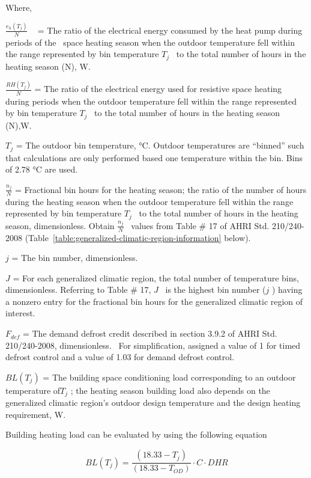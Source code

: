 Where,

\(\frac{{{e_h}({T_j})}}{N}\) ~ = The ratio of the electrical energy consumed by the heat pump during periods of the ~space heating season when the outdoor temperature fell within the range represented by bin temperature \({T_j}\) ~to the total number of hours in the heating season (N), W.

\(\frac{{RH({T_j})}}{N}\) = The ratio of the electrical energy used for resistive space heating during periods when the outdoor temperature fell within the range represented by bin temperature \({T_j}\) ~to the total number of hours in the heating season (N),W.

\({T_j}\) = The outdoor bin temperature, °C. Outdoor temperatures are ``binned'' such that calculations are only performed based one temperature within the bin. Bins of 2.78 °C are used.

\(\frac{{{n_j}}}{N}\) = Fractional bin hours for the heating season; the ratio of the number of hours during the heating season when the outdoor temperature fell within the range represented by bin temperature \({T_j}\) ~to the total number of hours in the heating season, dimensionless. Obtain \(\frac{{{n_j}}}{N}\) ~values from Table \# 17 of AHRI Std. 210/240-2008 (Table~\ref{table:generalized-climatic-region-information} below).

\(j\) = The bin number, dimensionless.

\(J\) = For each generalized climatic region, the total number of temperature bins, dimensionless. Referring to Table \# 17, \(J\) ~is the highest bin number (\(j\) ) having a nonzero entry for the fractional bin hours for the generalized climatic region of interest.

\({F_{def}}\) = The demand defrost credit described in section 3.9.2 of AHRI Std. 210/240-2008, dimensionless.~ For simplification, assigned a value of 1 for timed defrost control and a value of 1.03 for demand defrost control.

\(BL({T_j})\) = The building space conditioning load corresponding to an outdoor temperature of\({T_j}\) ; the heating season building load also depends on the generalized climatic region's outdoor design temperature and the design heating requirement, W.

Building heating load can be evaluated by using the following equation

\begin{equation}
  BL({T_j}) = \frac{{\left( {18.33 - {T_j}} \right)}}{{\left( {18.33 - {T_{OD}}} \right)}} \cdot C \cdot DHR
\end{equation}

